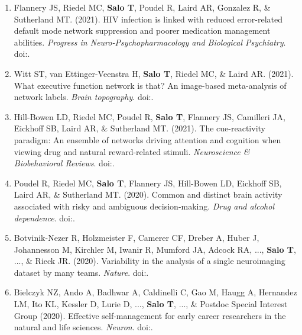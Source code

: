 \documentclass[10pt]{article}
\newcommand{\textlink}[3][blue]{\href{#2}{\color{#1}{#3}}}
\begin{document}
\begin{enumerate}
	\item Flannery JS, Riedel MC, \textbf{Salo T}, Poudel R, Laird AR, Gonzalez R, \& Sutherland MT.
	(2021).
	HIV infection is linked with reduced error-related default mode network suppression and poorer medication management abilities.
	\emph{Progress in Neuro-Psychopharmacology and Biological Psychiatry}.
	doi:\textlink{https://doi.org/10.1016/j.pnpbp.2021.110398}{10.1016/j.pnpbp.2021.110398}.

	\item Witt ST, van Ettinger-Veenstra H, \textbf{Salo T}, Riedel MC, \& Laird AR.
	(2021).
	What executive function network is that? An image-based meta-analysis of network labels.
	\emph{Brain topography}.
	doi:\textlink{https://doi.org/10.1007/s10548-021-00847-z}{10.1007/s10548-021-00847-z}.

	\item Hill-Bowen LD, Riedel MC, Poudel R, \textbf{Salo T}, Flannery JS, Camilleri JA, Eickhoff SB, Laird AR, \& Sutherland MT.
	(2021).
	The cue-reactivity paradigm: An ensemble of networks driving attention and cognition when viewing drug and natural reward-related stimuli.
	\emph{Neuroscience \& Biobehavioral Reviews}.
	doi:\textlink{https://doi.org/10.1016/j.neubiorev.2021.08.010}{10.1016/j.neubiorev.2021.08.010}.

	\item Poudel R, Riedel MC, \textbf{Salo T}, Flannery JS, Hill-Bowen LD, Eickhoff SB, Laird AR, \& Sutherland MT.
	(2020).
	Common and distinct brain activity associated with risky and ambiguous decision-making.
	\emph{Drug and alcohol dependence}.
	doi:\textlink{https://doi.org/10.1016/j.drugalcdep.2020.107884}{10.1016/j.drugalcdep.2020.107884}.

	\item Botvinik-Nezer R, Holzmeister F, Camerer CF, Dreber A, Huber J, Johannesson M, Kirchler M, Iwanir R, Mumford JA, Adcock RA, ..., \textbf{Salo T}, ..., \& Rieck JR.
	(2020).
	Variability in the analysis of a single neuroimaging dataset by many teams.
	\emph{Nature}.
	doi:\textlink{https://doi.org/10.1038/s41586-020-2314-9}{10.1038/s41586-020-2314-9}.

	\item Bielczyk NZ, Ando A, Badhwar A, Caldinelli C, Gao M, Haugg A, Hernandez LM, Ito KL, Kessler D, Lurie D, ..., \textbf{Salo T}, ..., \& Postdoc Special Interest Group
	(2020).
	Effective self-management for early career researchers in the natural and life sciences.
	\emph{Neuron}.
	doi:\textlink{https://doi.org/10.1016/j.neuron.2020.03.015}{10.1016/j.neuron.2020.03.015}.


\end{enumerate}
\end{document}
